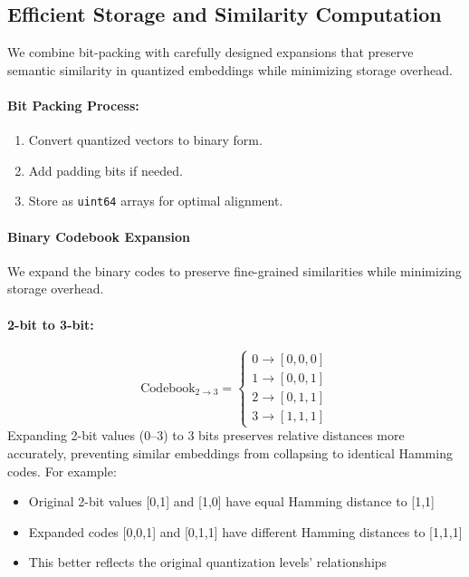 \subsection{Efficient Storage and Similarity Computation}
\label{subsec:storage_and_similarity}

We combine bit-packing with carefully designed expansions that preserve semantic similarity in quantized embeddings while minimizing storage overhead.

\paragraph{Bit Packing Process:}
\begin{enumerate}
    \item Convert quantized vectors to binary form. 
    \item Add padding bits if needed.
    \item Store as \texttt{uint64} arrays for optimal alignment.
\end{enumerate}

\paragraph{Binary Codebook Expansion}
We expand the binary codes to preserve fine-grained similarities while minimizing storage overhead.
\paragraph{2-bit to 3-bit:}
\begin{equation}
\text{Codebook}_{2\rightarrow3} =
\begin{cases}
0 \rightarrow [0,0,0]\\
1 \rightarrow [0,0,1]\\
2 \rightarrow [0,1,1]\\
3 \rightarrow [1,1,1]
\end{cases}
\end{equation}
Expanding 2-bit values (0--3) to 3 bits preserves relative distances more accurately, preventing similar embeddings from collapsing to identical Hamming codes.
For example:
\begin{itemize}
    \item Original 2-bit values [0,1] and [1,0] have equal Hamming distance to [1,1]
    \item Expanded codes [0,0,1] and [0,1,1] have different Hamming distances to [1,1,1]
    \item This better reflects the original quantization levels' relationships
\end{itemize}

